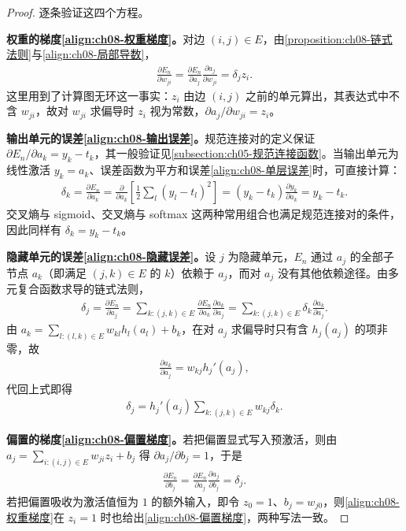 \documentclass[../../main.tex]{subfiles}
\begin{document}
\begin{proof}
逐条验证这四个方程。

\textbf{权重的梯度\eqref{align:ch08-权重梯度}。}对边 $(i,j)\in E$，由\cref{proposition:ch08-链式法则}与\eqref{align:ch08-局部导数}，
\begin{align*}
\frac{\partial E_n}{\partial w_{ji}}=\frac{\partial E_n}{\partial a_j}\frac{\partial a_j}{\partial w_{ji}}=\delta_j z_i .
\end{align*}
这里用到了计算图无环这一事实：$z_i$ 由边 $(i,j)$ 之前的单元算出，其表达式中不含 $w_{ji}$，故对 $w_{ji}$ 求偏导时 $z_i$ 视为常数，$\partial a_j/\partial w_{ji}=z_i$。

\textbf{输出单元的误差\eqref{align:ch08-输出误差}。}规范连接对的定义保证 $\partial E_n/\partial a_k=y_k-t_k$，其一般验证见\cref{subsection:ch05-规范连接函数}。当输出单元为线性激活 $y_k=a_k$、误差函数为平方和误差\eqref{align:ch08-单层误差}时，可直接计算：
\begin{align*}
\delta_k=\frac{\partial E_n}{\partial a_k}=\frac{\partial}{\partial a_k}\left[\frac{1}{2}\sum_{l}\left(y_l-t_l\right)^{2}\right]=\left(y_k-t_k\right)\frac{\partial y_k}{\partial a_k}=y_k-t_k .
\end{align*}
交叉熵与 sigmoid、交叉熵与 softmax 这两种常用组合也满足规范连接对的条件，因此同样有 $\delta_k=y_k-t_k$。

\textbf{隐藏单元的误差\eqref{align:ch08-隐藏误差}。}设 $j$ 为隐藏单元，$E_n$ 通过 $a_j$ 的全部子节点 $a_k$（即满足 $(j,k)\in E$ 的 $k$）依赖于 $a_j$，而对 $a_j$ 没有其他依赖途径。由多元复合函数求导的链式法则，
\begin{align*}
\delta_j=\frac{\partial E_n}{\partial a_j}=\sum_{k:(j,k)\in E}\frac{\partial E_n}{\partial a_k}\frac{\partial a_k}{\partial a_j}=\sum_{k:(j,k)\in E}\delta_k\frac{\partial a_k}{\partial a_j}.
\end{align*}
由 $a_k=\sum_{l:(l,k)\in E}w_{kl}h_l(a_l)+b_k$，在对 $a_j$ 求偏导时只有含 $h_j(a_j)$ 的项非零，故
\begin{align*}
\frac{\partial a_k}{\partial a_j}=w_{kj}h_j'(a_j),
\end{align*}
代回上式即得
\begin{align*}
\delta_j=h_j'(a_j)\sum_{k:(j,k)\in E}w_{kj}\delta_k .
\end{align*}

\textbf{偏置的梯度\eqref{align:ch08-偏置梯度}。}若把偏置显式写入预激活，则由 $a_j=\sum_{i:(i,j)\in E}w_{ji}z_i+b_j$ 得 $\partial a_j/\partial b_j=1$，于是
\begin{align*}
\frac{\partial E_n}{\partial b_j}=\frac{\partial E_n}{\partial a_j}\frac{\partial a_j}{\partial b_j}=\delta_j .
\end{align*}
若把偏置吸收为激活值恒为 $1$ 的额外输入，即令 $z_0=1$、$b_j=w_{j0}$，则\eqref{align:ch08-权重梯度}在 $z_i=1$ 时也给出\eqref{align:ch08-偏置梯度}，两种写法一致。
\end{proof}
\end{document}
